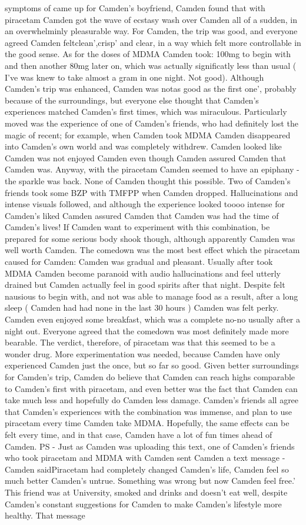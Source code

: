 \documentclass[12pt]{book}
\begin{document}
symptoms of came up for Camden's boyfriend, Camden found that with piracetam Camden got the wave of ecstasy wash over Camden all of a sudden, in an overwhelminly pleasurable way. For Camden, the trip was good, and everyone agreed Camden feltclean',crisp' and clear, in a way which felt more controllable in the good sense. As for the doses of MDMA Camden took: 100mg to begin with and then another 80mg later on, which was actually significatly less than usual ( I've was knew to take almost a gram in one night. Not good). Although Camden's trip was enhanced, Camden was notas good as the first one', probably because of the surroundings, but everyone else thought that Camden's experiences matched Camden's first times, which was miraculous. Particularly moved was the experience of one of Camden's friends, who had definitely lost the magic of recent; for example, when Camden took MDMA Camden disappeared into Camden's own world and was completely withdrew. Camden looked like Camden was not enjoyed Camden even though Camden assured Camden that Camden was. Anyway, with the piracetam Camden seemed to have an epiphany - the sparkle was back. None of Camden thought this possible. Two of Camden's friends took some BZP with TMFPP when Camden dropped. Hallucinations and intense visuals followed, and although the experience looked toooo intense for Camden's liked Camden assured Camden that Camden was had the time of Camden's lives! If Camden want to experiment with this combination, be prepared for some serious body shook though, although apparently Camden was well worth Camden. The comedown was the most best effect which the piracetam caused for Camden: Camden was gradual and pleasant. Usually after took MDMA Camden become paranoid with audio hallucinations and feel utterly drained but Camden actually feel in good spirits after that night. Despite felt nausious to begin with, and not was able to manage food as a result, after a long sleep ( Camden had had none in the last 30 hours ) Camden was felt perky. Camden even enjoyed some breakfast, which was a complete no-no usually after a night out. Everyone agreed that the comedown was most definitely made more bearable. The verdict, therefore, of piracetam was that this seemed to be a wonder drug. More experimentation was needed, because Camden have only experienced Camden just the once, but so far so good. Given better surroundings for Camden's trip, Camden do believe that Camden can reach highs comparable to Camden's first with piracetam, and even better was the fact that Camden can take much less and hopefully do Camden less damage. Camden's friends all agree that Camden's experiences with the combination was immense, and plan to use piracetam every time Camden take MDMA. Hopefully, the same effects can be felt every time, and in that case, Camden have a lot of fun times ahead of Camden. PS - Just as Camden was uploading this text, one of Camden's friends who took piracetam and MDMA with Camden sent Camden a text message - Camden saidPiracetam had completely changed Camden's life, Camden feel so much better Camden's untrue. Something was wrong but now Camden feel free.' This friend was at University, smoked and drinks and doesn't eat well, despite Camden's constant suggestions for Camden to make Camden's lifestyle more healthy. That message 
\end{document}
